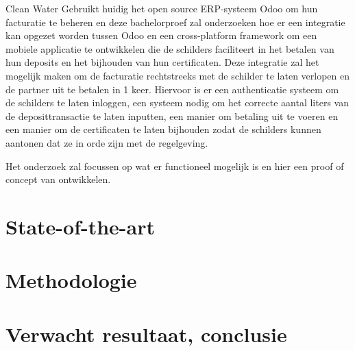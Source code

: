 \bigskip

Clean Water Gebruikt huidig het open source ERP-systeem Odoo om hun facturatie te beheren en deze bachelorproef zal onderzoeken hoe er een integratie kan opgezet worden 
tussen Odoo en een cross-platform framework om een mobiele applicatie te ontwikkelen die de schilders faciliteert in het betalen van hun deposits en het bijhouden van hun certificaten.
Deze integratie zal het mogelijk maken om de facturatie rechtstreeks met de schilder te laten verlopen en de partner uit te betalen in 1 keer.
Hiervoor is er een authenticatie systeem om de schilders te laten inloggen, een systeem nodig om het correcte aantal liters van de deposittransactie te laten inputten, 
een manier om betaling uit te voeren en een manier om de certificaten te laten bijhouden zodat de schilders kunnen aantonen dat ze in orde zijn met de regelgeving.

\bigskip 

Het onderzoek zal focussen op wat er functioneel mogelijk is en hier een proof of concept van ontwikkelen.


\section{State-of-the-art}%
\label{sec:state-of-the-art}



\section{Methodologie}%
\label{sec:methodologie}




\section{Verwacht resultaat, conclusie}%
\label{sec:verwachte_resultaten}

